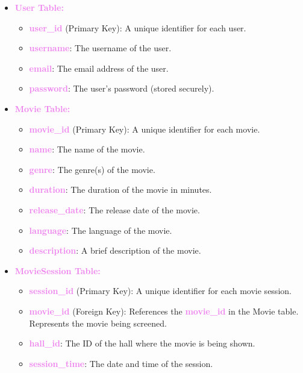 \documentclass[a4paper,12pt]{article}  %
\renewcommand{\textbf}[1]{\textcolor{violet}{\bfseries #1}}
\begin{document}
\begin{itemize}
    \item \textbf{User Table:}
    \begin{itemize}
        \item \textbf{user\_id} (Primary Key): A unique identifier for each user.
        \item \textbf{username}: The username of the user.
        \item \textbf{email}: The email address of the user.
        \item \textbf{password}: The user's password (stored securely).
    \end{itemize}
    
    \item \textbf{Movie Table:}
    \begin{itemize}
        \item \textbf{movie\_id} (Primary Key): A unique identifier for each movie.
        \item \textbf{name}: The name of the movie.
        \item \textbf{genre}: The genre(s) of the movie.
        \item \textbf{duration}: The duration of the movie in minutes.
        \item \textbf{release\_date}: The release date of the movie.
        \item \textbf{language}: The language of the movie.
        \item \textbf{description}: A brief description of the movie.
    \end{itemize}
    
    \item \textbf{MovieSession Table:}
    \begin{itemize}
        \item \textbf{session\_id} (Primary Key): A unique identifier for each movie session.
        \item \textbf{movie\_id} (Foreign Key): References the \textbf{movie\_id} in the Movie table. Represents the movie being screened.
        \item \textbf{hall\_id}: The ID of the hall where the movie is being shown.
        \item \textbf{session\_time}: The date and time of the session.
    \end{itemize}


\end{itemize}
\end{document}
